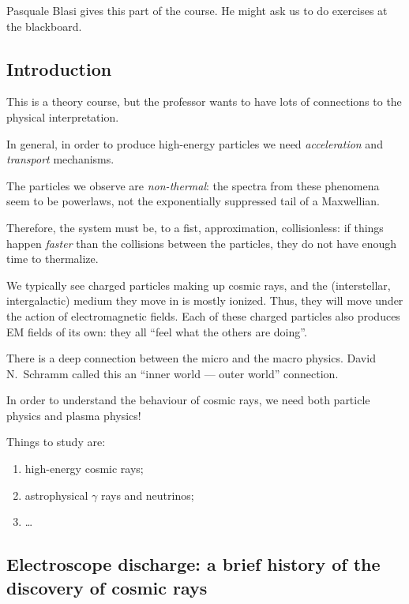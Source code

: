 \documentclass[main.tex]{subfiles}
\begin{document}

Pasquale Blasi gives this part of the course. 
He might ask us to do exercises at the blackboard. 

\subsection*{Introduction}

This is a theory course, but the professor wants to have lots of connections to the physical interpretation.

In general, in order to produce high-energy particles we need \emph{acceleration} and \emph{transport} mechanisms. 

The particles we observe are \emph{non-thermal}: 
the spectra from these phenomena seem to be powerlaws, not 
the exponentially suppressed tail of a Maxwellian.

Therefore, the system must be, to a fist, approximation, collisionless: if things happen \emph{faster} than the collisions between the particles, they do not have enough time to thermalize.

We typically see charged particles making up cosmic rays, 
and the (interstellar, intergalactic) medium they move in is mostly ionized. 
Thus, they will move under the action of electromagnetic fields. 
Each of these charged particles also produces EM fields of its own: they all ``feel what the others are doing''.

There is a deep connection between the micro and the macro physics. 
David N.\ Schramm called this an ``inner world --- outer world'' connection. 

In order to understand the behaviour of cosmic rays, we need both particle physics and plasma physics! 

Things to study are: 
\begin{enumerate}
    \item high-energy cosmic rays;
    \item astrophysical \(\gamma \) rays and neutrinos;
    \item \dots
\end{enumerate}

\subsection*{Electroscope discharge: a brief history of the discovery of cosmic rays}
\end{document}
